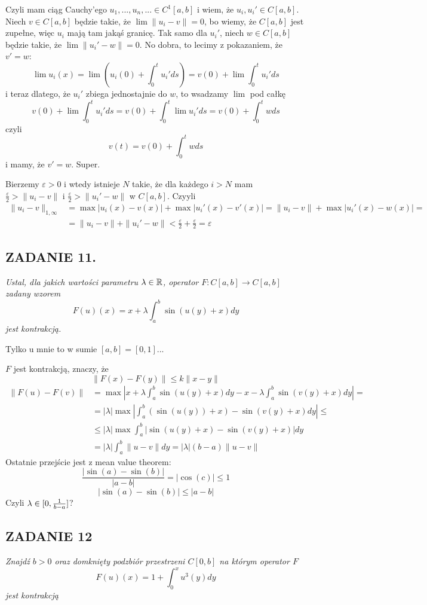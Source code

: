 \documentclass{article}
\begin{document}
Czyli mam ciąg Cauchy'ego $u_1,...,u_n,...\in C^1[a, b]$ i wiem, że $u_i,u_i'\in C[a, b]$. Niech $v\in C[a,b]$ będzie takie, że $\lim\|u_i-v\|=0$, bo wiemy, że $C[a,b]$ jest zupełne, więc $u_i$ mają tam jakąś granicę. Tak samo dla $u_i'$, niech $w\in C[a, b]$ będzie takie, że $\lim\|u_i'-w\|=0$. No dobra, to lecimy z pokazaniem, że $v'=w$:
$$\lim u_i(x)=\lim \left(u_i(0)+\int_0^tu_i'ds\right)=v(0)+\lim\int_0^tu_i'ds$$
i teraz dlatego, że $u_i'$ zbiega jednostajnie do $w$, to wsadzamy $\lim$ pod całkę
$$v(0)+\lim\int_0^tu_i'ds=v(0)+\int_0^t\lim u_i'ds=v(0)+\int_0^twds$$
czyli
$$v(t)=v(0)+\int_0^twds$$
i mamy, że $v'=w$. Super.

Bierzemy $\varepsilon>0$ i wtedy istnieje $N$ takie, że dla każdego $i>N$ mam $\frac\varepsilon2>\|u_i-v\|$ i $\frac\varepsilon2>\|u_i'-w\|$ w $C[a,b]$. Czyyli
\begin{align*}
    \|u_i-v\|_{1,\infty}&=\max|u_i(x)-v(x)|+\max|u_i'(x)-v'(x)|=\|u_i-v\|+\max|u_i'(x)-w(x)|=\\
    &=\|u_i-v\|+\|u_i'-w\|<\frac\varepsilon2+\frac\varepsilon2=\varepsilon
\end{align*}

\subsection*{ZADANIE 11.}
{\color{purple}\emph{Ustal, dla jakich wartości parametru $\lambda\in\mathbb{R}$, operator $F:C[a,b]\to C[a,b]$ zadany wzorem}
$$F(u)(x)=x+\lambda\int_a^b\sin(u(y)+x)dy$$
\emph{jest kontrakcją.}
}

Tylko u mnie to w sumie $[a, b]=[0, 1]$...

$F$ jest kontrakcją, znaczy, że
$$\|F(x)-F(y)\|\leq k\|x-y\|$$
\begin{align*}
    \|F(u)-F(v)\|&=\max\left|x+\lambda\int_a^b\sin(u(y)+x)dy-x-\lambda\int_a^b\sin(v(y)+x)dy\right|=\\
    &=|\lambda|\max\left|\int_a^b(\sin(u(y))+x)-\sin(v(y)+x)dy\right|\leq\\
    &\leq|\lambda|\max\int_a^b|\sin(u(y)+x)-\sin(v(y)+x)|dy\\
    &=|\lambda|\int_a^b\|u-v\|dy=|\lambda|(b-a)\|u-v\|
\end{align*}
Ostatnie przejście jest z mean value theorem:
$$\frac{|\sin(a)-\sin(b)|}{|a-b|}=|\cos(c)|\leq 1$$
$$|\sin(a)-\sin(b)|\leq |a-b|$$
Czyli $\lambda\in[0, {1\over b-a}]$? 

\subsection*{ZADANIE 12}
{\slshape\color{purple}Znajdź $b>0$ oraz domknięty podzbiór przestrzeni $C[0,b]$ na którym operator $F$
$$F(u)(x)=1+\int_0^xu^3(y)dy$$
jest kontrakcją}
\end{document}
